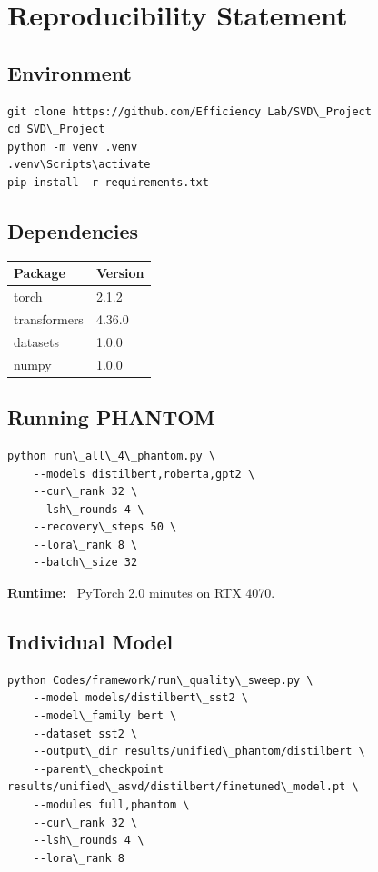 
\section{Reproducibility Statement}

\subsection{Environment}

\begin{lstlisting}
git clone https://github.com/Efficiency Lab/SVD\_Project
cd SVD\_Project
python -m venv .venv
.venv\Scripts\activate
pip install -r requirements.txt
\end{lstlisting}

\subsection{Dependencies}

\begin{table}[H]
\centering
\small
\begin{tabular}{ll}
\toprule
\textbf{Package} & \textbf{Version} \\
\midrule
torch & 2.1.2 \\
transformers & 4.36.0 \\
datasets & 1.0.0 \\
numpy & 1.0.0 \\
\bottomrule
\end{tabular}
\end{table}

\subsection{Running PHANTOM}

\begin{lstlisting}
python run\_all\_4\_phantom.py \
    --models distilbert,roberta,gpt2 \
    --cur\_rank 32 \
    --lsh\_rounds 4 \
    --recovery\_steps 50 \
    --lora\_rank 8 \
    --batch\_size 32
\end{lstlisting}

\textbf{Runtime:} ~PyTorch 2.0 minutes on RTX 4070.

\subsection{Individual Model}

\begin{lstlisting}
python Codes/framework/run\_quality\_sweep.py \
    --model models/distilbert\_sst2 \
    --model\_family bert \
    --dataset sst2 \
    --output\_dir results/unified\_phantom/distilbert \
    --parent\_checkpoint results/unified\_asvd/distilbert/finetuned\_model.pt \
    --modules full,phantom \
    --cur\_rank 32 \
    --lsh\_rounds 4 \
    --lora\_rank 8
\end{lstlisting}

